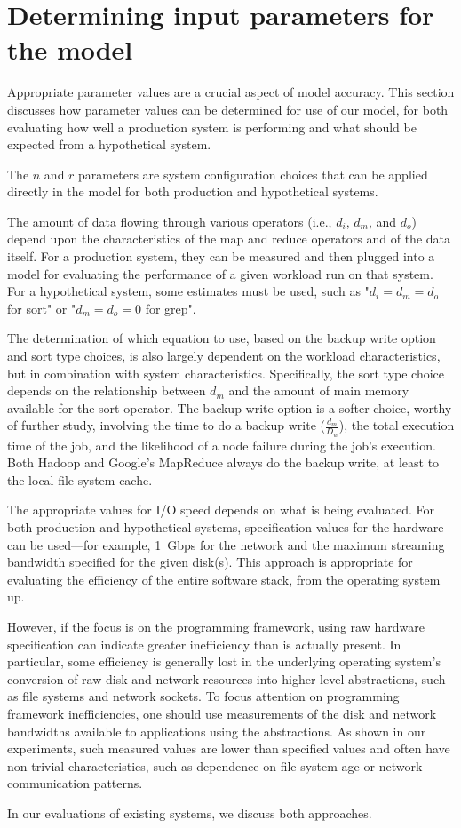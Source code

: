 \section{Determining input parameters for the model}
\label{sec:parameters}

Appropriate parameter values are a crucial aspect of model accuracy.
This section discusses how parameter values can be determined for use
of our model, for both evaluating how well a production system is
performing and what should be expected from a hypothetical system.

The $n$ and $r$ parameters are system configuration choices that can
be applied directly in the model for both production and hypothetical
systems.

The amount of data flowing through various operators (i.e., $d_i$,
$d_m$, and $d_o$) depend upon the characteristics of the map and
reduce operators and of the data itself.
For a production system, they can be measured and then plugged into
a model for evaluating the performance of a given workload run on that system.
For a hypothetical system, some estimates must be used, such as
"$d_i = d_m = d_o$ for sort" or "$d_m = d_o = 0$ for grep".

The determination of which equation to use, based on the backup write
option and sort type choices, is also largely dependent on the workload
characteristics, but in combination with system characteristics.
Specifically, the sort type choice depends on the relationship between
$d_m$ and the amount of main memory available for the sort operator.
The backup write option is a softer choice, worthy of further study,
involving the time to do a backup write ($\frac{d_m}{D_w}$), the
total execution time of the job, and the likelihood of a node failure
during the job's execution.
Both Hadoop and Google's MapReduce always do the backup write, at least
to the local file system cache.

The appropriate values for I/O speed depends on what is being evaluated.
For both production and hypothetical systems, specification values
for the hardware can be used---for example, 1~Gbps for the network
and the maximum streaming bandwidth specified for the given disk(s).
This approach is appropriate for evaluating the efficiency of the
entire software stack, from the operating system up.

However, if the focus is on the programming framework, using raw
hardware specification can indicate greater inefficiency than is
actually present.
In particular, some efficiency is generally lost in the underlying
operating system's conversion of raw disk and network resources into
higher level abstractions, such as file systems and network sockets.
To focus attention on programming framework inefficiencies,
one should use measurements of the disk and network bandwidths available
to applications using the abstractions.
As shown in our experiments, such measured values are lower than
specified values and often have non-trivial characteristics, such as
dependence on file system age or network communication patterns.

In our evaluations of existing systems, we discuss both approaches.


